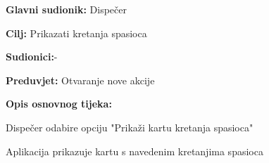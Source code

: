 			    \noindent {}
			    \begin{packed_item}
			    	
			    	\item \textbf{Glavni sudionik: }Dispečer
			    	\item  \textbf{Cilj:} Prikazati kretanja spasioca
			    	\item  \textbf{Sudionici:}- 
			    	\item  \textbf{Preduvjet:} Otvaranje nove akcije
			    	\item  \textbf{Opis osnovnog tijeka:}
			    	
			    	\item[] \begin{packed_enum}
			    		
			    		\item Dispečer odabire opciju "Prikaži kartu kretanja spasioca"
			    		\item Aplikacija prikazuje kartu s navedenim kretanjima spasioca\\
			    	\end{packed_enum}
			    \end{packed_item}
			    

